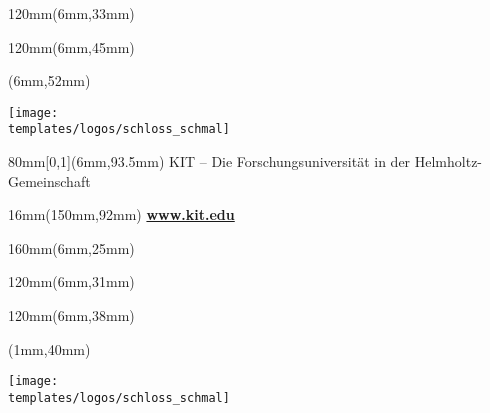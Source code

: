 {{			%
			\begin{textblock*}{120mm}(6mm,33mm)
				\large \textbf{\insertsubtitle}
			\end{textblock*}
			
			\begin{textblock*}{120mm}(6mm,45mm)
				\normalsize\insertauthor%
			\end{textblock*}
		
		
			\begin{textblock*}{\paperwidth}(6mm,52mm)
				\begin{flushleft}
				\texttt{[image: \\templates/logos/schloss\_schmal]} 
				\end{flushleft}
			\end{textblock*}
		
			
			\begin{textblock*}{80mm}[0,1](6mm,93.5mm)
				\fontsize{4pt}{6pt}\selectfont
				{KIT -- Die Forschungsuniversit\"at in der Helmholtz-Gemeinschaft}
			\end{textblock*}
			
			\begin{textblock*}{16mm}(150mm,92mm)
				\fontsize{8pt}{8pt}\selectfont
				\bfseries
				\textcolor{gray}{\href{http://www.kit.edu}{www.kit.edu} }
			\end{textblock*}
	}{ %
			\begin{textblock*}{160mm}(6mm,25mm)
				\Large\textbf{\inserttitle}
			\end{textblock*}
			
			\begin{textblock*}{120mm}(6mm,31mm)
				\normalsize\textbf{\insertsubtitle}
			\end{textblock*}
			
			\begin{textblock*}{120mm}(6mm,38mm)
				\normalsize\insertauthor%
			\end{textblock*}
		
		
			\begin{textblock*}{\paperwidth}(1mm,40mm)
				\begin{center}
				\texttt{[image: \\templates/logos/schloss\_schmal]} 
				\end{center}
			\end{textblock*}
		
}}

